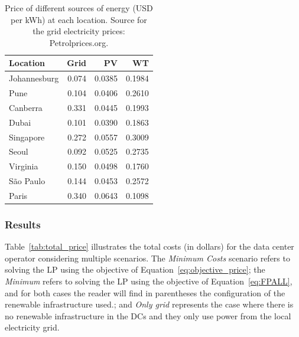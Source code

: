 \begin{table}[h]
  
  \caption{Price of different sources of energy (USD per kWh) at each location. Source for the grid electricity prices: Petrolprices.org.  }\label{tab:price_electricity_sources} \centering
  
  \begin{tabular}{|l|r|r|r|}
  \hline    
  \textbf{Location} &   \textbf{Grid} & \textbf{PV} & \textbf{WT} \\
  \hline
  Johannesburg & 0.074 & 0.0385 &  0.1984   \\
  \hline
  Pune      &  0.104   & 0.0406 & 0.2610    \\
  \hline
  Canberra  & 0.331    &  0.0445 & 0.1993   \\
  \hline
  Dubai   & 0.101      & 0.0390 &   0.1863  \\
  \hline
  Singapore & 0.272    & 0.0557 & 0.3009    \\
  \hline     
  Seoul      & 0.092   & 0.0525 & 0.2735    \\
  \hline
  Virginia   & 0.150   &  0.0498 &  0.1760  \\
  \hline
  São Paulo  & 0.144   &  0.0453 & 0.2572   \\
  \hline 
  Paris      & 0.340   &  0.0643 & 0.1098   \\
  \hline  

\end{tabular}
\end{table}

\subsubsection{Results}

Table~\ref{tab:total_price} illustrates the total costs (in dollars) for the data center operator considering multiple scenarios. The \textit{Minimum Costs} scenario refers to solving the LP using the objective of Equation~\eqref{eq:objective_price}; the \textit{Minimum } refers to solving the LP using the objective of Equation~\eqref{eq:FPALL}, and for both cases the reader will find in parentheses the configuration of the renewable infrastructure used.; and \textit{Only grid} represents the case where there is no renewable infrastructure in the DCs and they only use power from the local electricity grid.


